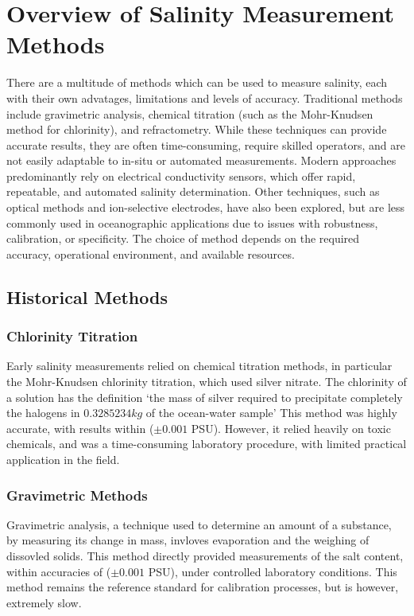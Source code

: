 \section{Overview of Salinity Measurement Methods}
There are a multitude of methods which can be used to measure salinity, each with their own advatages, limitations and levels of accuracy.
Traditional methods include gravimetric analysis, chemical titration (such as the Mohr-Knudsen method for chlorinity), and refractometry. While these techniques can provide accurate results, they are often time-consuming, require skilled operators, and are not easily adaptable to in-situ or automated measurements.
Modern approaches predominantly rely on electrical conductivity sensors, which offer rapid, repeatable, and automated salinity determination.
Other techniques, such as optical methods and ion-selective electrodes, have also been explored, but are less commonly used in oceanographic applications due to issues with robustness, calibration, or specificity.
The choice of method depends on the required accuracy, operational environment, and available resources.


\subsection{Historical Methods}
\subsubsection{Chlorinity Titration}
Early salinity measurements relied on chemical titration methods, in particular the Mohr-Knudsen chlorinity titration, which used silver nitrate.
The chlorinity of a solution has the definition `the mass of silver required to precipitate completely the halogens in $0.3 285 234 kg$ of the ocean-water sample'
This method was highly accurate, with results within ($\pm0.001$ PSU). However, it relied heavily on toxic chemicals, and was a time-consuming laboratory procedure, with limited practical application in the field.

\subsubsection{Gravimetric Methods}
Gravimetric analysis, a technique used to determine an amount of a substance, by measuring its change in mass, invloves evaporation and the weighing of dissovled solids.
This method directly provided measurements of the salt content, within accuracies of ($\pm0.001$ PSU), under controlled laboratory conditions.
This method remains the reference standard for calibration processes, but is however, extremely slow.

